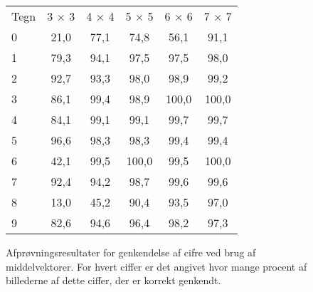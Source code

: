 \begin{figure}[htp]
\centering
\begin{tabular}{|l|c|c|c|c|c|}\hline
\rowcolor[gray]{0.9} \multicolumn{6}{|>{\columncolor[gray]{0.9}}c|}{\textbf{Middelvektor}} \\ \hline
Tegn & 3 $\times$ 3 & 4 $\times$ 4 & 5 $\times$ 5 & 6 $\times$ 6 & 7 $\times$ 7\\\hline
0 & 21,0 & 77,1 & 74,8 & 56,1 & 91,1\\\hline
1 & 79,3 & 94,1 & 97,5 & 97,5 & 98,0\\\hline
2 & 92,7 & 93,3 & 98,0 & 98,9 & 99,2\\\hline
3 & 86,1 & 99,4 & 98,9 & 100,0 & 100,0\\\hline
4 & 84,1 & 99,1 & 99,1 & 99,7 & 99,7\\\hline
5 & 96,6 & 98,3 & 98,3 & 99,4 & 99,4\\\hline
6 & 42,1 & 99,5 & 100,0 & 99,5 & 100,0\\\hline
7 & 92,4 & 94,2 & 98,7 & 99,6 & 99,6\\\hline
8 & 13,0 & 45,2 & 90,4 & 93,5 & 97,0\\\hline
9 & 82,6 & 94,6 & 96,4 & 98,2 & 97,3\\\hline
\end{tabular}
\caption{Afprøvningsresultater for genkendelse af cifre ved brug af middelvektorer. For hvert ciffer er det angivet hvor mange procent af billederne af dette ciffer, der er korrekt genkendt.}
\label{fig:test:middel_tal}
\end{figure}

